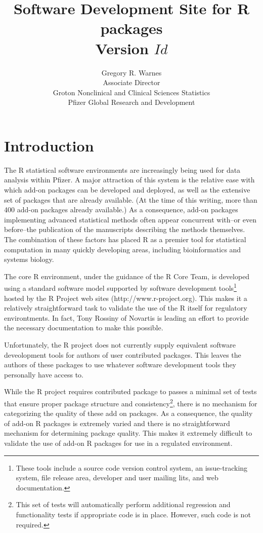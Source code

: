 \documentclass[12pt]{article}
\title{Software Development Site for R packages\\
       Version $Id$ }
\author{Gregory R. Warnes\\
  Associate Director\\
  Groton Nonclinical and Clinical Sciences Statistics\\
  Pfizer Global Research and Development}
\begin{document}
\maketitle

\section{Introduction}

The R statistical software environments are increasingly being used
for data analysis within Pfizer.  A major attraction of this system is
the relative ease with which add-on packages can be developed and
deployed, as well as the extensive set of packages that are already
available.  (At the time of this writing, more than 400 add-on
packages already available.)  As a consequence, add-on packages
implementing advanced statistical methods often appear concurrent
with--or even before--the publication of the manuscripts describing
the methods themselves.  The combination of these factors has placed R
as a premier tool for statistical computation in many quickly
developing areas, including bioinformatics and systems biology.

The core R environment, under the guidance of the R Core Team, is
developed using a standard software model supported by software
development tools\footnote{These tools include a source code version
  control system, an issue-tracking system, file release area,
  developer and user mailing lits, and web documentation.}  hosted by
the R Project web sites (http://www.r-project.org).  This makes it a
relatively straightforward task to validate the use of the R itself
for regulatory environtments.  In fact, Tony Rossiny of Novartis is
leading an effort to provide the necessary documentation to make this
possible.

Unfortunately, the R project does not currently supply equivalent
software deveolopment tools for authors of user contributed packages.
This leaves the authors of these packages to use whatever software
development tools they personally have access to.  

While the R project requires contributed package to passes a minimal
set of tests that ensure proper package structure and
consistency\footnote{This set of tests will automatically perform
  additional regression and functionality tests if appropriate code is
  in place.  However, such code is not required.}, there is no
mechanism for categorizing the quality of these add on packages.  As a
consequence, the quality of add-on R packages is extremely varied and
there is no straightforward mechanism for determining package quality.
This makes it extremely difficult to validate the use of add-on R
packages for use in a regulated environment.
\end{document}
